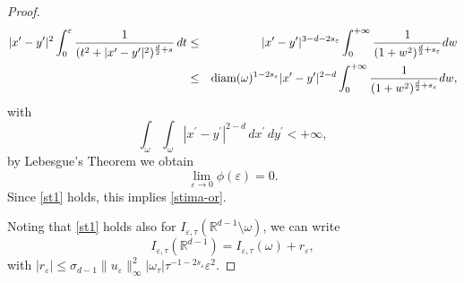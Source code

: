 \documentclass[11pt]{article}
\def\e{\varepsilon}
\begin{document}
\begin{proof}
\begin{eqnarray*}
|x^\prime-y^\prime|^2\int_0^\e\frac{1}{(t^2+|x^\prime-y^\prime|^2)^{\frac{d}{2}+s}}\, dt
&\leq&|x^\prime-y^\prime|^{3-d-2s_\e} \int_0^{+\infty}\frac{1}{(1+w^2)^{\frac{d}{2}+s_\e}} d w \\
&\leq&\hbox{\rm diam}(\omega)^{1-2s_\e} |x^\prime-y^\prime|^{2-d}\int_0^{+\infty}\frac{1}{(1+w^2)^{\frac{d}{2}+s_\e}} d w, 
\end{eqnarray*}
with
$$\int_{\omega}\int_{\omega}|x^\prime-y^\prime|^{2-d}\, dx^\prime\, dy^\prime<+\infty,$$ 
by Lebesgue's Theorem we obtain 
$$\lim_{\e\to 0}\phi(\e)=0.$$
Since \eqref{st1} holds, this implies \eqref{stima-or}.

Noting that \eqref{st1} holds also for $I_{\e,\tau}(\mathbb R^{d-1}\setminus\omega)$, we can write
\begin{equation}\label{stima-semi}
I_{\e,\tau}(\mathbb R^{d-1})
= I_{\e,\tau}(\omega)+r_\e, 
\end{equation}
with $|r_\e|\leq \sigma_{d-1}\|u_\e\|^2_\infty |\omega_\tau|\tau^{-1-2s_\e}\e^2$. 


\end{proof}
\end{document}

